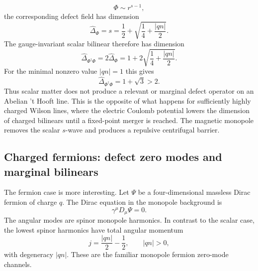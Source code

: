 \documentclass[11pt]{article}
\begin{document}
\begin{equation}
  \Phi\sim r^{s-1},
\end{equation}
the corresponding defect field has dimension
\begin{equation}
  \widehat\Delta_\Phi=s
  =\frac12+\sqrt{\frac14+\frac{|qn|}{2}} .
\end{equation}
The gauge-invariant scalar bilinear therefore has dimension
\begin{equation}
  \widehat\Delta_{\Phi^\dagger\Phi}
  =2\widehat\Delta_\Phi
  =1+2\sqrt{\frac14+\frac{|qn|}{2}} .
  \label{eq:scalarBilinearThooftDimension}
\end{equation}
For the minimal nonzero value $|qn|=1$ this gives
\begin{equation}
  \widehat\Delta_{\Phi^\dagger\Phi}=1+\sqrt3>2 .
\end{equation}
Thus scalar matter does not produce a relevant or marginal defect operator on an Abelian 't Hooft line.  This is the opposite of what happens for sufficiently highly charged Wilson lines, where the electric Coulomb potential lowers the dimension of charged bilinears until a fixed-point merger is reached.  The magnetic monopole removes the scalar $s$-wave and produces a repulsive centrifugal barrier.

\subsection{Charged fermions: defect zero modes and marginal bilinears}

The fermion case is more interesting.  Let $\Psi$ be a four-dimensional massless Dirac fermion of charge $q$.  The Dirac equation in the monopole background is
\begin{equation}
  \gamma^\mu D_\mu\Psi=0 .
\end{equation}
The angular modes are spinor monopole harmonics.  In contrast to the scalar case, the lowest spinor harmonics have total angular momentum
\begin{equation}
  j=\frac{|qn|}{2}-\frac12,
  \qquad |qn|>0,
  \label{eq:spinorMonopoleLowestJ}
\end{equation}
with degeneracy $|qn|$.  These are the familiar monopole fermion zero-mode channels.
\end{document}
